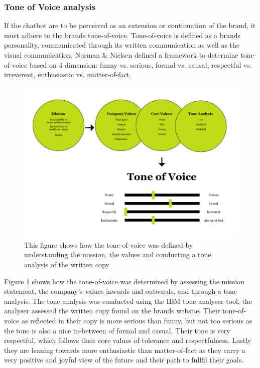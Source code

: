         \subsubsection{Tone of Voice analysis}
    
        If the chatbot are to be perceived as an extension or continuation of the brand, it must adhere to the brands tone-of-voice. Tone-of-voice is defined as a brands personality, communicated through its written communication as well as the visual communication. Norman \& Nielsen defined a framework to determine tone-of-voice based on 4 dimension: funny vs. serious, formal vs. causal, respectful vs. irreverent, enthusiastic vs. matter-of-fact.
    
        \begin{figure}
            \centering
            \includegraphics[width=\textwidth]{figures/Tone-of-voice.png}
            \caption{This figure shows how the tone-of-voice was defined by understanding the mission, the values and conducting a tone analysis of the written copy}
            \label{fig:tov}
        \end{figure}
    
        Figure \ref{fig:tov} shows how the tone-of-voice was determined by assessing the mission statement, the company's values inwards and outwards, and through a tone analysis. The tone analysis was conducted using the IBM tone analyser tool, the analyser assessed the written copy found on the brands website. Their tone-of-voice as reflected in their copy is more serious than funny, but not too serious as the tone is also a nice in-between of formal and casual. Their tone is very respectful, which follows their core values of tolerance and respectfulness. Lastly they are leaning towards more enthusiastic than matter-of-fact as they carry a very positive and joyful view of the future and their path to fullfil their goals.

